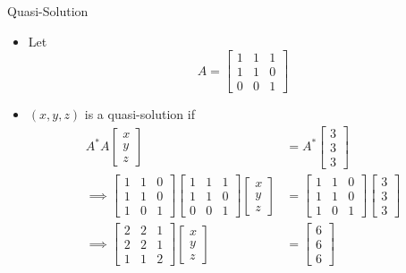 \documentclass[usenames,dvipsnames,10pt]{beamer}
\begin{document}
\begin{frame}
  {Quasi-Solution}

  \begin{itemize}
  \item Let
    \[
      A = \begin{bmatrix} 1 & 1 & 1 \\ 1 & 1 & 0 \\ 0 & 0 & 1\end{bmatrix}
    \]
  \item $(x,y,z)$ is a quasi-solution if
    \begin{align*}
      A^*A\begin{bmatrix} x \\ y \\ z \end{bmatrix} &= A^*\begin{bmatrix} 3 \\ 3 \\ 3 \end{bmatrix}\\
      \implies \begin{bmatrix} 1 & 1 & 0 \\ 1 & 1 & 0 \\ 1 & 0 & 1\end{bmatrix}
      \begin{bmatrix} 1 & 1 & 1 \\ 1 & 1 & 0 \\ 0 & 0 & 1\end{bmatrix}\begin{bmatrix} x \\ y \\ z \end{bmatrix}
      &= \begin{bmatrix} 1 & 1 & 0 \\ 1 & 1 & 0 \\ 1 & 0 & 1\end{bmatrix}
        \begin{bmatrix} 3 \\ 3 \\ 3 \end{bmatrix}\\
      \implies
      \begin{bmatrix} 2 & 2 & 1 \\ 2 & 2 & 1 \\ 1 & 1 & 2 \end{bmatrix}\begin{bmatrix} x \\ y \\ z \end{bmatrix}
      &= \begin{bmatrix} 6 \\ 6 \\ 6 \end{bmatrix}
    \end{align*}
  \end{itemize}
\end{frame}
\end{document}
